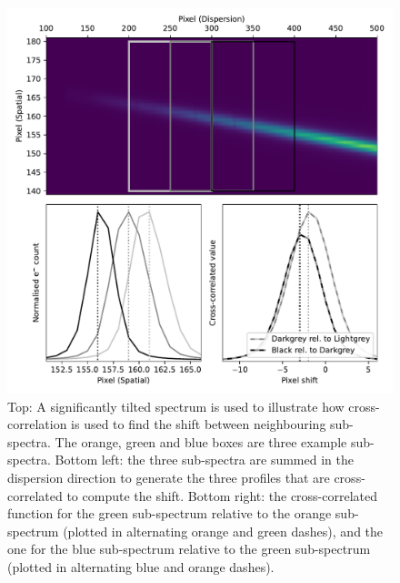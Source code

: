 \documentclass[linenumbers, twocolumn]{aastex631}
\begin{document}
\begin{figure}
    \centering
    \includegraphics[width=\columnwidth]{fig_01_tracing.pdf}
    \caption{Top: A significantly tilted spectrum is used to illustrate how
    cross-correlation is used to find the shift between neighbouring
    sub-spectra. The orange, green and blue boxes are three example
    sub-spectra. Bottom left: the three sub-spectra are summed in
    the dispersion direction to generate the three profiles that are
    cross-correlated to compute the shift. Bottom right: the
    cross-correlated function for the green sub-spectrum relative
    to the orange sub-spectrum (plotted in alternating orange and green dashes), and the one
    for the blue sub-spectrum relative to the green sub-spectrum
    (plotted in alternating blue and orange dashes).}
    \label{fig:trace}
\end{figure}


\end{document}
